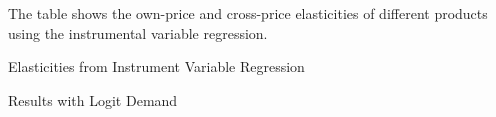 \documentclass[11pt,letterpaper]{article}
\newcommand{\floatintro}[1]{
  
  \vspace*{0.1in}
  
  {\footnotesize

    #1
    
  }
  
  \vspace*{0.1in} }
\begin{document}
\begin{table}[htbp!]
  \floatintro{The table shows the own-price and cross-price
    elasticities of different products using the instrumental variable
  regression.}
  \centering
  
  \caption{Elasticities from Instrument Variable Regression}
  \label{tab:iv_elas}
\end{table}

\begin{table}[htbp!]
  \centering
  \resizebox{.7\textwidth}{!}{
  }
  \caption{Results with Logit Demand}
  \label{tab:ols_iv}
\end{table}
\end{document}
